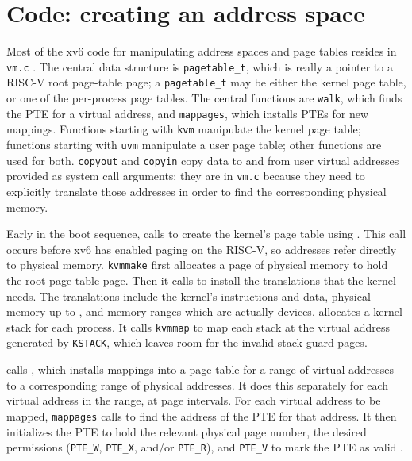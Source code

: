 \section{Code: creating an address space}

Most of the xv6 code for manipulating address spaces and
page tables resides in {\tt vm.c}
.
The central data structure is {\tt pagetable\_t}, which
is really a pointer to a RISC-V root page-table page;
a {\tt pagetable\_t} may be either the kernel
page table, or one of the per-process page tables.
The central functions are {\tt walk},
which finds the PTE for a virtual address,
and {\tt mappages}, which installs PTEs for new mappings.
Functions starting with {\tt kvm} manipulate
the kernel page table; functions starting with {\tt uvm}
manipulate a user page table; other functions are
used for both.
{\tt copyout} and {\tt copyin} copy data to and from
user virtual addresses provided as system call arguments;
they are in {\tt vm.c} because they need to explicitly
translate those addresses in order to find the corresponding
physical memory.

Early in the boot sequence,
calls
to create the kernel's page table using
.
This call occurs before xv6 has enabled paging on the RISC-V,
so addresses refer directly to physical memory.
\lstinline{kvmmake}
first allocates a page of physical memory to hold the root page-table page.
Then it calls
to install the translations that the kernel needs.
The translations include the kernel's
instructions and data, physical memory up to
,
and memory ranges which are actually devices.
allocates a kernel stack for each
process. It calls \lstinline{kvmmap} to map each stack at the virtual address generated by
\lstinline{KSTACK}, which leaves room for the invalid stack-guard
pages.

calls
,
which
installs mappings into a page table
for a range of virtual addresses to
a corresponding range of physical addresses.
It does this separately for each virtual address in the range,
at page intervals.
For each virtual address to be mapped,
\lstinline{mappages}
calls
to find the address of the PTE for that address.
It then initializes the PTE to hold the relevant physical page
number, the desired permissions 
(\lstinline{PTE_W},
\lstinline{PTE_X},
and/or
\lstinline{PTE_R}),
and
\lstinline{PTE_V}
to mark the PTE as valid
.

